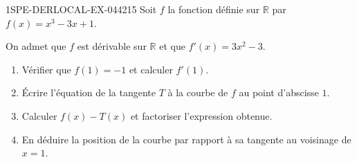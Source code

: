 \begin{exercice}{1SPE-DERLOCAL-EX-044}{2}{15}
Soit $f$ la fonction définie sur $\mathbb{R}$ par $f(x) = x^3 - 3x + 1$.

On admet que $f$ est dérivable sur $\mathbb{R}$ et que $f'(x) = 3x^2 - 3$.
\begin{enumerate}
\item Vérifier que $f(1) = -1$ et calculer $f'(1)$.
\item Écrire l'équation de la tangente $T$ à la courbe de $f$ au point d'abscisse $1$.
\item Calculer $f(x) - T(x)$ et factoriser l'expression obtenue.
\item En déduire la position de la courbe par rapport à sa tangente au voisinage de $x = 1$.
\end{enumerate}
\end{exercice}
